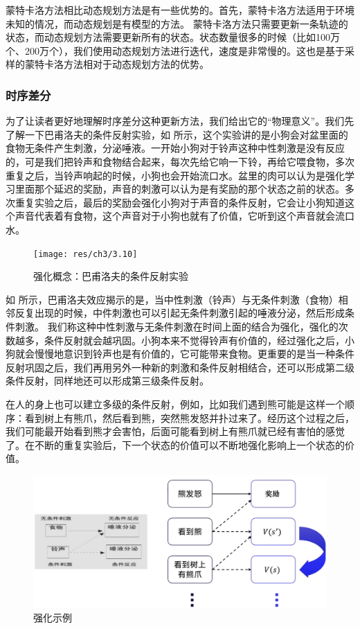 蒙特卡洛方法相比动态规划方法是有一些优势的。首先，蒙特卡洛方法适用于环境未知的情况，而动态规划是有模型的方法。
蒙特卡洛方法只需要更新一条轨迹的状态，而动态规划方法需要更新所有的状态。状态数量很多的时候（比如100万个、200万个），我们使用动态规划方法进行迭代，速度是非常慢的。这也是基于采样的蒙特卡洛方法相对于动态规划方法的优势。

\subsubsection{时序差分} 

为了让读者更好地理解时序差分这种更新方法，我们给出它的“物理意义”。我们先了解一下巴甫洛夫的条件反射实验，如 所示，这个实验讲的是小狗会对盆里面的食物无条件产生刺激，分泌唾液。一开始小狗对于铃声这种中性刺激是没有反应的，可是我们把铃声和食物结合起来，每次先给它响一下铃，再给它喂食物，多次重复之后，当铃声响起的时候，小狗也会开始流口水。盆里的肉可以认为是强化学习里面那个延迟的奖励，声音的刺激可以认为是有奖励的那个状态之前的状态。多次重复实验之后，最后的奖励会强化小狗对于声音的条件反射，它会让小狗知道这个声音代表着有食物，这个声音对于小狗也就有了价值，它听到这个声音就会流口水。

\begin{figure}[htb]
	\centering
	\texttt{[image: res/ch3/3.10]}
	\caption{强化概念：巴甫洛夫的条件反射实验}
	\label{fig:fig3.10}
\end{figure}

如 所示，巴甫洛夫效应揭示的是，当中性刺激（铃声）与无条件刺激（食物）相邻反复出现的时候，中件刺激也可以引起无条件刺激引起的唾液分泌，然后形成条件刺激。
我们称这种中性刺激与无条件刺激在时间上面的结合为强化，强化的次数越多，条件反射就会越巩固。小狗本来不觉得铃声有价值的，经过强化之后，小狗就会慢慢地意识到铃声也是有价值的，它可能带来食物。更重要的是当一种条件反射巩固之后，我们再用另外一种新的刺激和条件反射相结合，还可以形成第二级条件反射，同样地还可以形成第三级条件反射。

在人的身上也可以建立多级的条件反射，例如，比如我们遇到熊可能是这样一个顺序：看到树上有熊爪，然后看到熊，突然熊发怒并扑过来了。经历这个过程之后，我们可能最开始看到熊才会害怕，后面可能看到树上有熊爪就已经有害怕的感觉了。在不断的重复实验后，下一个状态的价值可以不断地强化影响上一个状态的价值。

\begin{figure}[htb]
	\centering
	\includegraphics[width=0.5\linewidth]{res/ch3/3.11}
	\caption{强化示例}
	\label{fig:fig3.11}
\end{figure}

